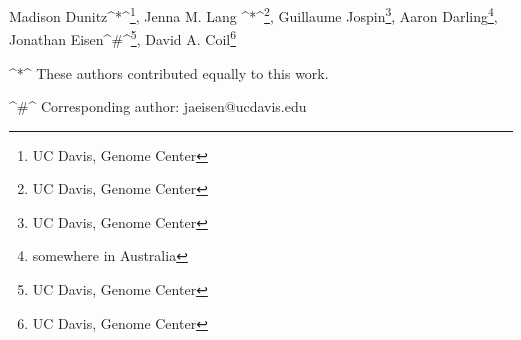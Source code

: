 Madison Dunitz^*^\footnote{UC Davis, Genome Center}, Jenna M. Lang ^*^\footnote{UC Davis, Genome Center}, Guillaume Jospin\footnote{UC Davis, Genome Center}, Aaron Darling\footnote{somewhere in Australia}, Jonathan Eisen^\#^\footnote{UC Davis, Genome Center}, David A. Coil\footnote{UC Davis, Genome Center} 

^*^ These authors contributed equally to this work.

^#^ Corresponding author: jaeisen@ucdavis.edu